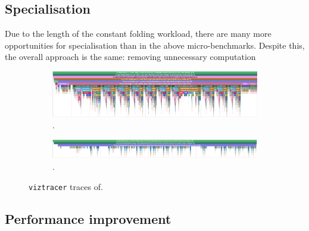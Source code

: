 \subsection{Specialisation}
\label{sec:specialising-pattern-rewriting-specialisation}

Due to the length of the constant folding workload, there are many more opportunities for specialisation than in the above micro-benchmarks. Despite this, the overall approach is the same: removing unnecessary computation


\begin{figure}[H]
    \centering
    \begin{subfigure}[b]{\textwidth}
        \centering
        \includegraphics[width=\textwidth]{images/specialising_optimising_xdsl_rewriting/custom_constant_fold.png}
        \captionsetup{width=0.8\textwidth}
        \caption{.}
        \label{fig:constant-fold-original-viztracer}
    \end{subfigure}
    \begin{subfigure}[b]{\textwidth}
        \centering
        \includegraphics[width=\textwidth]{images/specialising_optimising_xdsl_rewriting/optimised_constant_fold.png}
        \captionsetup{width=0.8\textwidth}
        \caption{.}
        \label{fig:constant-fold-optimised-viztracer}
    \end{subfigure}
    \caption{\texttt{viztracer} traces of.}
    \label{fig:constant-fold-viztracer}
\end{figure}



\subsection{Performance improvement}
\label{sec:specialising-pattern-rewriting-performance}

